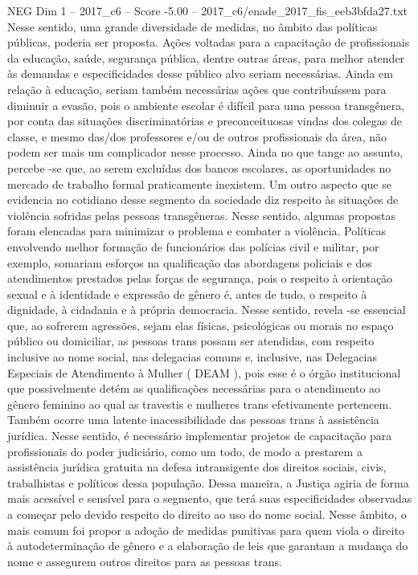 \begin{textsample}{NEG Dim 1 – 2017\_c6 – Score -5.00 – 2017\_c6/enade\_2017\_fis\_eeb3bfda27.txt}
Nesse sentido, uma grande diversidade de medidas, no âmbito das políticas públicas, poderia ser proposta.
Ações voltadas para a capacitação de profissionais da educação, saúde, segurança pública, dentre outras áreas, para melhor atender às demandas e especificidades desse público alvo seriam necessárias.
Ainda em relação à educação, seriam também necessárias ações que contribuíssem para diminuir a evasão, pois o ambiente escolar é difícil para uma pessoa transgênera, por conta das situações discriminatórias e preconceituosas vindas dos colegas de classe, e mesmo das/dos professores e/ou de outros profissionais da área, não podem ser mais um complicador nesse processo.
Ainda no que tange ao assunto, percebe -se que, ao serem excluídas dos bancos escolares, as oportunidades no mercado de trabalho formal praticamente inexistem.
Um outro aspecto que se evidencia no cotidiano desse segmento da sociedade diz respeito às situações de violência sofridas pelas pessoas transgêneras.
Nesse sentido, algumas propostas foram elencadas para minimizar o problema e combater a violência.
Políticas envolvendo melhor formação de funcionários das polícias civil e militar, por exemplo, somariam esforços na qualificação das abordagens policiais e dos atendimentos prestados pelas forças de segurança, pois o respeito à orientação sexual e à identidade e expressão de gênero é, antes de tudo, o respeito à dignidade, à cidadania e à própria democracia.
Nesse sentido, revela -se essencial que, ao sofrerem agressões, sejam elas físicas, psicológicas ou morais no espaço público ou domiciliar, as pessoas trans possam ser atendidas, com respeito inclusive ao nome social, nas delegacias comuns e, inclusive, nas Delegacias Especiais de Atendimento à Mulher ( DEAM ), pois esse é o órgão institucional que possivelmente detém as qualificações necessárias para o atendimento ao gênero feminino ao qual as travestis e mulheres trans efetivamente pertencem.
Também ocorre uma latente inacessibilidade das pessoas trans à assistência jurídica.
Nesse sentido, é necessário implementar projetos de capacitação para profissionais do poder judiciário, como um todo, de modo a prestarem a assistência jurídica gratuita na defesa intransigente dos direitos sociais, civis, trabalhistas e políticos dessa população.
Dessa maneira, a Justiça agiria de forma mais acessível e sensível para o segmento, que terá suas especificidades observadas a começar pelo devido respeito do direito ao uso do nome social.
Nesse âmbito, o mais comum foi propor a adoção de medidas punitivas para quem viola o direito à autodeterminação de gênero e a elaboração de leis que garantam a mudança do nome e assegurem outros direitos para as pessoas trans.

\end{textsample}
